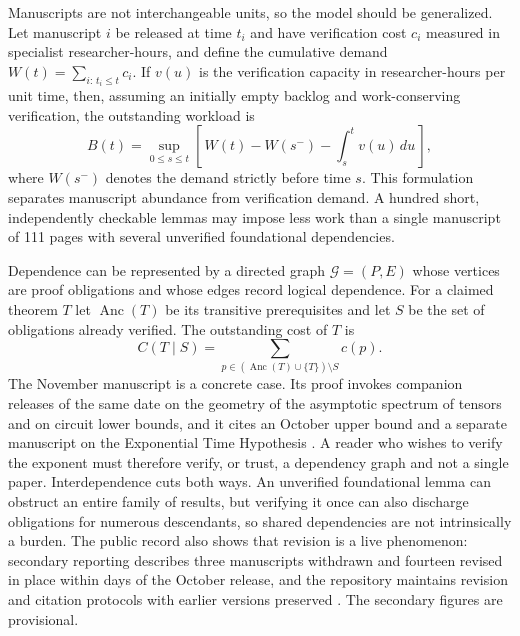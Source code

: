 \documentclass[12pt]{article}
\begin{document}
Manuscripts are not interchangeable units, so the model should be generalized. Let manuscript $i$ be released at time $t_i$ and have verification cost $c_i$ measured in specialist researcher-hours, and define the cumulative demand $W(t)=\sum_{i:\,t_i\le t} c_i$. If $v(u)$ is the verification capacity in researcher-hours per unit time, then, assuming an initially empty backlog and work-conserving verification, the outstanding workload is
\begin{equation}
B(t)=\sup_{0\le s\le t}\left[\,W(t)-W(s^-)-\int_s^t v(u)\,du\,\right],
\end{equation}
where $W(s^-)$ denotes the demand strictly before time $s$. This formulation separates manuscript abundance from verification demand. A hundred short, independently checkable lemmas may impose less work than a single manuscript of 111 pages with several unverified foundational dependencies.

Dependence can be represented by a directed graph $\mathcal G=(P,E)$ whose vertices are proof obligations and whose edges record logical dependence. For a claimed theorem $T$ let $\operatorname{Anc}(T)$ be its transitive prerequisites and let $S$ be the set of obligations already verified. The outstanding cost of $T$ is
\begin{equation}
C(T\mid S)=\sum_{p\in(\operatorname{Anc}(T)\cup\{T\})\setminus S} c(p).
\end{equation}
The November manuscript is a concrete case. Its proof invokes companion releases of the same date on the geometry of the asymptotic spectrum of tensors and on circuit lower bounds, and it cites an October upper bound and a separate manuscript on the Exponential Time Hypothesis \cite{openai-nine-fourths}. A reader who wishes to verify the exponent must therefore verify, or trust, a dependency graph and not a single paper. Interdependence cuts both ways. An unverified foundational lemma can obstruct an entire family of results, but verifying it once can also discharge obligations for numerous descendants, so shared dependencies are not intrinsically a burden. The public record also shows that revision is a live phenomenon: secondary reporting describes three manuscripts withdrawn and fourteen revised in place within days of the October release, and the repository maintains revision and citation protocols with earlier versions preserved \cite{openai-first-look, tech-insider-722}. The secondary figures are provisional.
\end{document}
